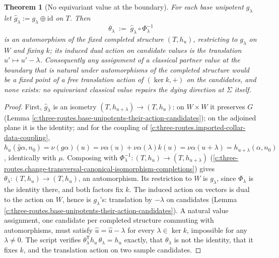 \documentclass[11pt]{article}
\newtheorem{theorem}{Theorem}[section]
\theoremstyle{definition}
\theoremstyle{plain}
\providecommand{\Sig}{}\renewcommand{\Sig}{\Sigma}
\providecommand{\id}{}\renewcommand{\id}{\mathrm{id}}
\providecommand{\nO}{}\renewcommand{\nO}{n_0}
\begin{document}
\begin{theorem}[No equivariant value at the boundary]\label{c:three-routes.no-equivariant-value-boundary}
For each base unipotent $g_\lambda$ let $\hat g_\lambda := g_\lambda \oplus \id$ on $T$. Then
\[
\theta_\lambda \;:=\; \hat g_\lambda \circ \Phi_\lambda^{-1}
\]
is an automorphism of the fixed completed structure $(T, h_u)$, restricting to $g_\lambda$ on $W$ and fixing $k$; its induced dual action on candidate values is the translation $u' \mapsto u' - \lambda$. Consequently any assignment of a classical partner value at the boundary that is natural under automorphisms of the completed structure would be a fixed point of a free translation action of $(\ker k, +)$ on the candidates, and none exists: \emph{no equivariant classical value repairs the dying direction at $\Sig$ itself}.
\end{theorem}
\begin{proof}
First, $\hat g_\lambda$ is an isometry $(T, h_{u+\lambda}) \to (T, h_u)$: on $W \times W$ it preserves $G$ (Lemma \ref{c:three-routes.base-unipotents-their-action-candidates}); on the adjoined plane it is the identity; and for the coupling of \ref{c:three-routes.imported-collar-data-coupling}, $h_u(\hat g\alpha, \nO) = \nu(g\alpha)(u) = \nu\alpha(u) + \nu\alpha(\lambda)k(u) = \nu\alpha(u + \lambda) = h_{u+\lambda}(\alpha, \nO)$, identically with $\mu$. Composing with $\Phi_\lambda^{-1} : (T, h_u) \to (T, h_{u+\lambda})$ (\ref{c:three-routes.change-transversal-canonical-isomorphism-completions}) gives $\theta_\lambda : (T, h_u) \to (T, h_u)$, an automorphism. Its restriction to $W$ is $g_\lambda$, since $\Phi_\lambda$ is the identity there, and both factors fix $k$. The induced action on vectors is dual to the action on $W$, hence is $g_\lambda$'s: translation by $-\lambda$ on candidates (Lemma \ref{c:three-routes.base-unipotents-their-action-candidates}). A natural value assignment, one candidate per completed structure commuting with automorphisms, must satisfy $\hat u = \hat u - \lambda$ for every $\lambda \in \ker k$, impossible for any $\lambda \neq 0$. The script verifies $\theta_\lambda^{\mathsf{T}} h_u\, \theta_\lambda = h_u$ exactly, that $\theta_\lambda$ is not the identity, that it fixes $k$, and the translation action on two sample candidates.

\end{proof}
\end{document}
